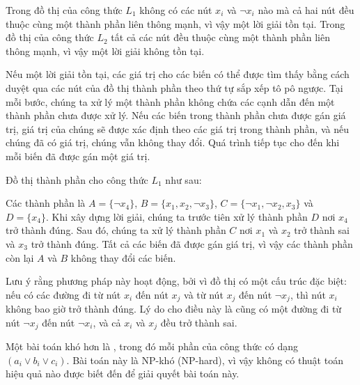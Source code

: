 Trong đồ thị của công thức $L_1$
không có các nút $x_i$ và $\lnot x_i$ nào
mà cả hai nút
đều thuộc cùng một thành phần liên thông mạnh,
vì vậy một lời giải tồn tại.
Trong đồ thị của công thức $L_2$
tất cả các nút đều thuộc cùng một thành phần liên thông mạnh,
vì vậy một lời giải không tồn tại.

Nếu một lời giải tồn tại, các giá trị cho các biến
có thể được tìm thấy bằng cách duyệt qua các nút của
đồ thị thành phần theo thứ tự sắp xếp tô pô ngược.
Tại mỗi bước, chúng ta xử lý một thành phần
không chứa các cạnh dẫn đến một
thành phần chưa được xử lý.
Nếu các biến trong thành phần
chưa được gán giá trị,
giá trị của chúng sẽ được xác định
theo các giá trị trong thành phần,
và nếu chúng đã có giá trị,
chúng vẫn không thay đổi.
Quá trình tiếp tục cho đến khi mỗi biến
đã được gán một giá trị.

Đồ thị thành phần cho công thức $L_1$ như sau:
\begin{center}
\end{center}

Các thành phần là
$A = \{\lnot x_4\}$,
$B = \{x_1, x_2, \lnot x_3\}$,
$C = \{\lnot x_1, \lnot x_2, x_3\}$ và
$D = \{x_4\}$.
Khi xây dựng lời giải,
chúng ta trước tiên xử lý thành phần $D$
nơi $x_4$ trở thành đúng.
Sau đó, chúng ta xử lý thành phần $C$
nơi $x_1$ và $x_2$ trở thành sai
và $x_3$ trở thành đúng.
Tất cả các biến đã được gán giá trị,
vì vậy các thành phần còn lại $A$ và $B$
không thay đổi các biến.

Lưu ý rằng phương pháp này hoạt động, bởi vì
đồ thị có một cấu trúc đặc biệt:
nếu có các đường đi từ nút $x_i$ đến nút $x_j$
và từ nút $x_j$ đến nút $\lnot x_j$,
thì nút $x_i$ không bao giờ trở thành đúng.
Lý do cho điều này là cũng có
một đường đi từ nút $\lnot x_j$ đến nút $\lnot x_i$,
và cả $x_i$ và $x_j$ đều trở thành sai.


Một bài toán khó hơn là ,
trong đó mỗi phần của công thức có dạng
$(a_i \lor b_i \lor c_i)$.
Bài toán này là NP-khó (NP-hard), vì vậy không có thuật toán hiệu quả nào
được biết đến để giải quyết bài toán này.